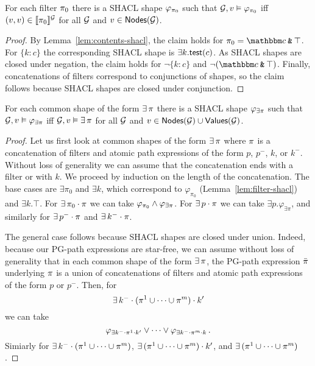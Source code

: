 \begin{lemma}
\label{lem:filter-shacl} For each filter $\pi_0$ there is a SHACL shape $\varphi_{\pi_0}$ such that  $\mathcal{G}, v\vDash \varphi_{\pi_0}$ iff $(v,v) \in \llbracket{\pi_0}\rrbracket^{\mathcal{G}}$ for all  $\mathcal{G}$ and $v\in\mathsf{Nodes}(\mathcal{G})$. 
\end{lemma}

\begin{proof} By Lemma~\ref{lem:contents-shacl}, the claim holds for $\pexpr_0=\ntype\tAnd \top$. For $\{k:c\}$ the corresponding SHACL shape is $\exists k.\mathsf{test}(c)$. 
As SHACL shapes are closed under negation, the claim holds for $\lnot \{k:c\}$ and $\lnot(\ntype\tAnd \top)$.
Finally, concatenations of filters correspond to conjunctions of shapes, so the claim follows because SHACL shapes are closed under conjunction. 
\end{proof}

\begin{lemma}
\label{lem:paths-shacl}
For each common shape of the form $\exists\,\pi$ there is a SHACL shape $\varphi_{\exists\pi}$ such that  $\mathcal{G}, v\vDash \varphi_{\exists\pi}$ iff $\mathcal{G},v\vDash \exists\, \pi$ for all $\mathcal{G}$ and $v\in\mathsf{Nodes}(\mathcal{G}) \cup \mathsf{Values}(\mathcal{G})$. 
\end{lemma}

\begin{proof}
Let us first look at common shapes of the form $\exists\,\pi$ where $\pi$ is a concatenation of filters and atomic path expressions of the form  $p$, $p^{-}$, $k$, or $k^{-}$. Without loss of generality we can assume that the concatenation ends with a filter or with $k$.
We proceed by induction on the length of the concatenation. The base cases are $\exists \pi_0$ and $\exists k$, which correspond to $\varphi_{\pi_0}$ (Lemma~\ref{lem:filter-shacl}) and $\exists k.\top$. 
For $\exists\, \pi_0\cdot\pi$ we can take $\varphi_{\pi_0} \land \varphi_{\exists \pi}$. For $\exists\, p\cdot\pi$ we can take $\exists p.\varphi_{\exists \pi}$, and similarly for $\exists\, p^{-}\cdot\pi$ and $\exists\, k^{-}\cdot\pi$. 

The general case follows because SHACL shapes are closed under union. Indeed, because our PG-path expressions are star-free, we can assume without loss of generality that in each common shape of the form $\exists\, \pi$, the PG-path expression $\bar{\pi}$ underlying $\pi$ is a union of concatenations of filters and atomic path expressions of the form $p$ or $p^{-}$. Then, for \[\exists\, k^{-}\cdot(\pi^1 \cup \dots \cup\pi^m)\cdot k'\] we can take \[\varphi_{\exists k^{-}\cdot\pi^1\cdot k'} \lor \dots \lor \varphi_{\exists k^{-}\cdot\pi^m\cdot k}\,.\] Simiarly for $\exists\, k^{-}\cdot(\pi^1 \cup \dots \cup\pi^m)$, $\exists\, (\pi^1 \cup \dots \cup\pi^m)\cdot k'$, and $\exists\, (\pi^1 \cup \dots \cup\pi^m)$.
\end{proof}

